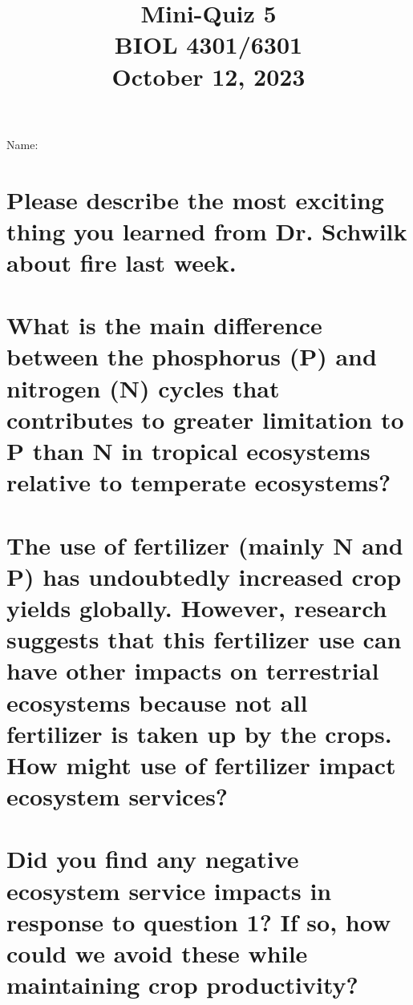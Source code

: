 \documentclass[12pt, notitlepage]{article}   	%
\title{
	\textbf{
		Mini-Quiz 5
	} \\
	\large BIOL 4301/6301 \\
	\large October 12, 2023 \\
}
\date{\vspace{-5ex}}
\def\wl{\par \vspace{\baselineskip}}
\begin{document}
{\selectfont %

\large{Name:}

{\let\newpage\relax\maketitle}

\section{\small{Please describe the most exciting thing you learned from Dr. Schwilk about fire
last week.}}

\wl
\wl
\wl
\wl
\wl
\wl
\wl
\wl
\wl

\section{\small{What is the main difference between the phosphorus (P) and nitrogen (N)
cycles that contributes to greater limitation to P than N in tropical ecosystems relative
to temperate ecosystems?}}

\newpage

\section{\small{The use of fertilizer (mainly N and P) has undoubtedly increased
crop yields globally. However, research suggests that this fertilizer use can have other
impacts on terrestrial ecosystems because not all fertilizer is taken up by the crops.
How might use of fertilizer impact ecosystem services?}}

\wl
\wl
\wl
\wl
\wl
\wl
\wl
\wl
\wl
\wl
\wl
\wl
\wl

\section{\small{Did you find any negative ecosystem service impacts in response to question 1?
If so, how could we avoid these while maintaining crop productivity?}}


} %
\end{document}

